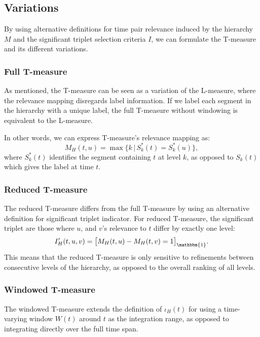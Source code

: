 \subsection{Variations}
By using alternative definitions for time pair relevance induced by the hierarchy \(M\) and the significant triplet selection criteria \(I\), we can formulate the T-measure and its different variations.

\subsubsection{Full T-measure}
As mentioned, the T-measure can be seen as a variation of the L-measure, where the relevance mapping disregards label information.
If we label each segment in the hierarchy with a unique label, the full T-measure without windowing is equivalent to the L-measure.

In other words, we can express T-measure's relevance mapping as:
\begin{equation}
    M_H(t,u) = \max \big\{
        k \, | \, S^*_k(t) = S^*_k(u)
    \big\},
    \label{eq:tmeasure_relevance_map}
\end{equation}
where $S^*_k(t)$ identifies the segment containing $t$ at level $k$, as opposed to $S_k(t)$ which gives the label at time $t$.

\subsubsection{Reduced T-measure}
The reduced T-measure differs from the full T-measure by using an alternative definition for significant triplet indicator.
For reduced T-measure, the significant triplet are those where $u$, and $v$'s relevance to $t$ differ by exactly one level:
\begin{align}
    I'_H(t,u,v) = \big[ M_H(t,u) - M_H(t,v) = 1\big]_{\mathbbm{1}}.
    \label{eq:reduced_tmeasure}
\end{align}
This means that the reduced T-measure is only sensitive to refinements between consecutive levels of the hierarchy, as opposed to the overall ranking of all levels.

\subsubsection{Windowed T-measure}
The windowed T-measure extends the definition of $\iota_H(t)$ for using a time-varying window $W(t)$ around $t$ as the integration range, as opposed to integrating directly over the full time span.

